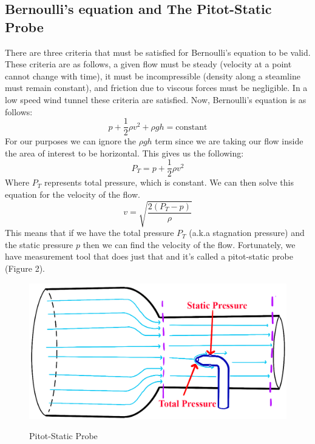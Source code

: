 \documentclass[12pt]{article}
\begin{document}
\subsection{Bernoulli's equation and The Pitot-Static Probe}
There are three criteria that must be satisfied for Bernoulli’s equation to be valid. These criteria are as follows, a given flow must be steady (velocity at a point cannot change with time), it must be incompressible (density along a steamline must remain constant), and friction due to viscous forces must be negligible. In a low speed wind tunnel these criteria are satisfied. Now, Bernoulli's equation is as follows:
\begin{equation}
    p+\frac{1}{2}\rho v^2+\rho g h = \mbox{constant}
\end{equation}
For our purposes we can ignore the \(\rho g h\) term since we are taking our flow inside the area of interest to be horizontal. This gives us the following:
\begin{equation}
    P_T = p+\frac{1}{2}\rho v^2 
\end{equation}
Where \(P_T\) represents total pressure, which is constant. We can then solve this equation for the velocity of the flow.
\begin{equation}
    v = \sqrt{\frac{2\left(P_T - p\right)}{\rho}}
\end{equation}
This means that if we have the total pressure \(P_T\) (a.k.a stagnation pressure) and the static pressure \(p\) then we can find the velocity of the flow. Fortunately, we have measurement tool that does just that and it's called a pitot-static probe (Figure 2).
    \begin{figure}[h]
        \includegraphics[width=14cm]{Figure2.png}
        \centering
        \label{Figure 2}
        \caption{Pitot-Static Probe}
    \end{figure}
\end{document}
